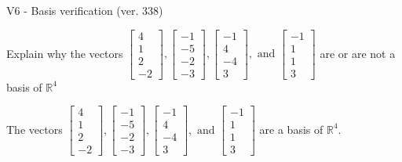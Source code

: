 \begin{exercise}
  \begin{exerciseTitle}V6 - Basis verification (ver. 338)\end{exerciseTitle}
  \begin{exerciseStatement}
    Explain why the vectors \(\left[\begin{array}{r}
4 \\
1 \\
2 \\
-2
\end{array}\right] , \left[\begin{array}{r}
-1 \\
-5 \\
-2 \\
-3
\end{array}\right] , \left[\begin{array}{r}
-1 \\
4 \\
-4 \\
3
\end{array}\right] , \text{ and } \left[\begin{array}{r}
-1 \\
1 \\
1 \\
3
\end{array}\right]\) are or are not a basis of \(\mathbb{R}^4\)	


  \end{exerciseStatement}
  \begin{exerciseAnswer}
   The vectors \(\left[\begin{array}{r}
4 \\
1 \\
2 \\
-2
\end{array}\right] , \left[\begin{array}{r}
-1 \\
-5 \\
-2 \\
-3
\end{array}\right] , \left[\begin{array}{r}
-1 \\
4 \\
-4 \\
3
\end{array}\right] , \text{ and } \left[\begin{array}{r}
-1 \\
1 \\
1 \\
3
\end{array}\right]\) 
  	 are  a basis of \(\mathbb{R}^4\).
  


  \end{exerciseAnswer}
\end{exercise}